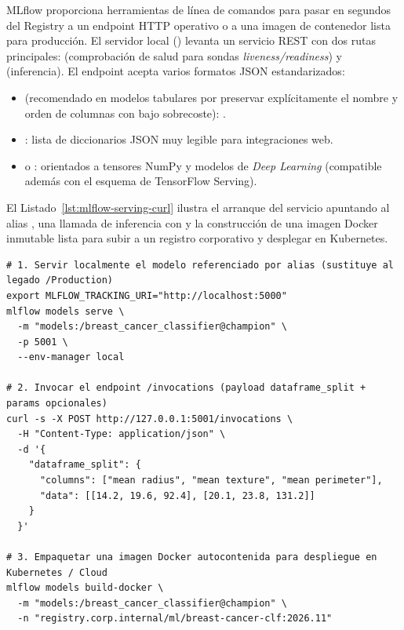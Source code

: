 MLflow proporciona herramientas de línea de comandos para pasar en segundos del Registry a un endpoint HTTP operativo o a una imagen de contenedor lista para producción. El servidor local () levanta un servicio REST con dos rutas principales:  (comprobación de salud para sondas \textit{liveness/readiness}) y  (inferencia). El endpoint  acepta varios formatos JSON estandarizados:
\begin{itemize}
  \item {} (recomendado en modelos tabulares por preservar explícitamente el nombre y orden de columnas con bajo sobrecoste): .
  \item {}: lista de diccionarios JSON \code{[\{"col\_a": 1.2, ...\}]} muy legible para integraciones web.
  \item {} o : orientados a tensores NumPy y modelos de \textit{Deep Learning} (compatible además con el esquema de TensorFlow Serving).
\end{itemize}

El Listado~\ref{lst:mlflow-serving-curl} ilustra el arranque del servicio apuntando al alias , una llamada de inferencia con  y la construcción de una imagen Docker inmutable lista para subir a un registro corporativo y desplegar en Kubernetes.

\begin{lstlisting}[style=bash, caption={Servicio local desde Model Registry con alias @champion, invocación REST y construcción de imagen Docker.}, label={lst:mlflow-serving-curl}]
# 1. Servir localmente el modelo referenciado por alias (sustituye al legado /Production)
export MLFLOW_TRACKING_URI="http://localhost:5000"
mlflow models serve \
  -m "models:/breast_cancer_classifier@champion" \
  -p 5001 \
  --env-manager local

# 2. Invocar el endpoint /invocations (payload dataframe_split + params opcionales)
curl -s -X POST http://127.0.0.1:5001/invocations \
  -H "Content-Type: application/json" \
  -d '{
    "dataframe_split": {
      "columns": ["mean radius", "mean texture", "mean perimeter"],
      "data": [[14.2, 19.6, 92.4], [20.1, 23.8, 131.2]]
    }
  }'

# 3. Empaquetar una imagen Docker autocontenida para despliegue en Kubernetes / Cloud
mlflow models build-docker \
  -m "models:/breast_cancer_classifier@champion" \
  -n "registry.corp.internal/ml/breast-cancer-clf:2026.11"
\end{lstlisting}

